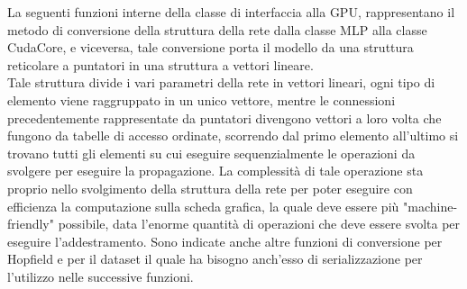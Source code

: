 \documentclass[10pt,a4paper]{article}
\begin{document}
La seguenti funzioni interne della classe di interfaccia alla GPU, rappresentano il metodo di conversione della struttura della rete dalla classe MLP alla classe CudaCore, e viceversa, tale conversione porta il modello da una struttura reticolare a puntatori in una struttura a vettori lineare.\\
Tale struttura divide i vari parametri della rete in vettori lineari, ogni tipo di elemento viene raggruppato in un unico vettore, mentre le connessioni precedentemente rappresentate da puntatori divengono vettori a loro volta che fungono da tabelle di accesso ordinate, scorrendo dal primo elemento all'ultimo si trovano tutti gli elementi su cui eseguire sequenzialmente le operazioni da svolgere per eseguire la propagazione. La complessità di tale operazione sta proprio nello svolgimento della struttura della rete per poter eseguire con efficienza la computazione sulla scheda grafica, la quale deve essere più "machine-friendly" possibile, data l'enorme quantità di operazioni che deve essere svolta per eseguire l'addestramento. 
Sono indicate anche altre funzioni di conversione per Hopfield e per il dataset il quale ha bisogno anch'esso di serializzazione per l'utilizzo nelle successive funzioni.
\end{document}
